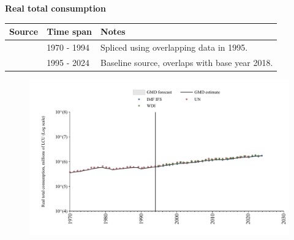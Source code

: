 \documentclass[12pt,a4paper,landscape]{article}
\begin{document}
\begin{adjustbox}{max totalsize={\paperwidth}{\paperheight},center}
\begin{minipage}[t][\textheight][t]{\textwidth}
\vspace*{0.5cm}
{}
\begin{center}
{\Large\bfseries Real total consumption}
\end{center}
\vspace{0.5cm}
\begin{table}[H]
\centering
\small
\begin{tabular}{|l|l|l|}
\hline
\textbf{Source} & \textbf{Time span} & \textbf{Notes} \\
\hline
\rowcolor{white}\cite{UN}& 1970 - 1994 &Spliced using overlapping data in 1995. \\
\rowcolor{lightgray}\cite{IMF_IFS}& 1995 - 2024 &Baseline source, overlaps with base year 2018. \\
\hline
\end{tabular}
\end{table}
\begin{figure}[H]
\centering
\includegraphics[width=\textwidth,height=0.6\textheight,keepaspectratio]{graphs/POL_rcons.pdf}
\end{figure}
\end{minipage}
\end{adjustbox}
\end{document}
